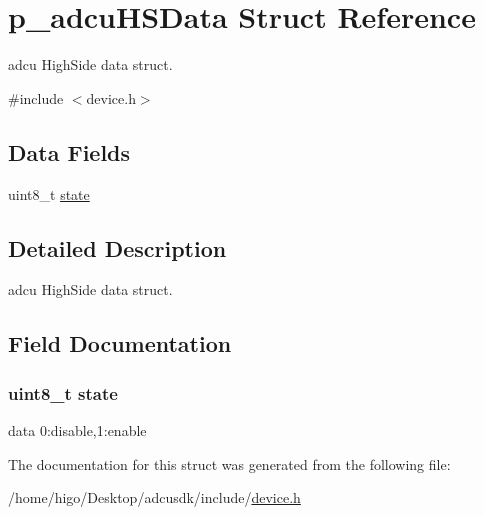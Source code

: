 \hypertarget{structp__adcuHSData}{}\section{p\+\_\+adcu\+H\+S\+Data Struct Reference}
\label{structp__adcuHSData}


adcu High\+Side data struct.  




{\ttfamily \#include $<$device.\+h$>$}

\subsection*{Data Fields}
\begin{DoxyCompactItemize}
\item 
uint8\+\_\+t \hyperlink{structp__adcuHSData_a0b57aa10271a66f3dc936bba1d2f3830}{state}
\end{DoxyCompactItemize}


\subsection{Detailed Description}
adcu High\+Side data struct. 

\subsection{Field Documentation}
\subsubsection[{\texorpdfstring{state}{state}}]{\setlength{\rightskip}{0pt plus 5cm}uint8\+\_\+t state}\hypertarget{structp__adcuHSData_a0b57aa10271a66f3dc936bba1d2f3830}{}\label{structp__adcuHSData_a0b57aa10271a66f3dc936bba1d2f3830}
data 0\+:disable,1\+:enable 

The documentation for this struct was generated from the following file\+:\begin{DoxyCompactItemize}
\item 
/home/higo/\+Desktop/adcusdk/include/\hyperlink{device_8h}{device.\+h}\end{DoxyCompactItemize}
